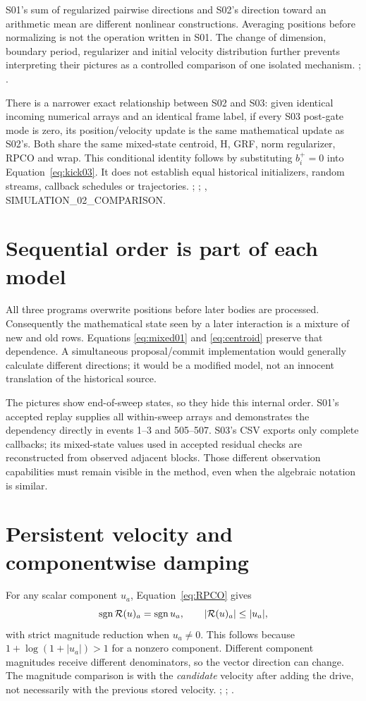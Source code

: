 S01's sum of regularized pairwise directions and S02's direction toward
an arithmetic mean are different nonlinear constructions. Averaging
positions before normalizing is not the operation written in S01.
The change of dimension, boundary period, regularizer and initial
velocity distribution further prevents interpreting their pictures as
a controlled comparison of one isolated mechanism.
; . 

There is a narrower exact relationship between S02 and S03:
given identical incoming numerical arrays and an identical frame label,
if every S03 post-gate mode is zero, its position/velocity update is
the same mathematical update as S02's. Both share the same mixed-state
centroid, H, GRF, norm regularizer, RPCO and wrap. This conditional
identity follows by substituting $b_i^+=0$ into
Equation~\eqref{eq:kick03}. It does not establish equal historical
initializers, random streams, callback schedules or trajectories.
; ;
\cite{study03}, SIMULATION\_02\_COMPARISON. 

\section{Sequential order is part of each model}
All three programs overwrite positions before later bodies are
processed. Consequently the mathematical state seen by a later
interaction is a mixture of new and old rows. Equations
\eqref{eq:mixed01} and \eqref{eq:centroid} preserve that dependence.
A simultaneous proposal/commit implementation would generally
calculate different directions; it would be a modified model,
not an innocent translation of the historical source.

The pictures show end-of-sweep states, so they hide this internal order.
S01's accepted replay supplies all within-sweep arrays and demonstrates
the dependency directly in events 1--3 and 505--507. S03's CSV exports
only complete callbacks; its mixed-state values used in accepted
residual checks are reconstructed from observed adjacent blocks.
Those different observation capabilities must remain visible in the
method, even when the algebraic notation is similar. 

\section{Persistent velocity and componentwise damping}
For any scalar component $u_a$, Equation~\eqref{eq:RPCO} gives
\begin{equation}\label{eq:damping}
\operatorname{sgn}\mathcal R(u)_a=\operatorname{sgn}u_a,\qquad
|\mathcal R(u)_a|\leq |u_a|,
\end{equation}
with strict magnitude reduction when $u_a\ne0$. This follows because
$1+\log(1+|u_a|)>1$ for a nonzero component. Different component
magnitudes receive different denominators, so the vector direction
can change. The magnitude comparison is with the \emph{candidate}
velocity after adding the drive, not necessarily with the previous
stored velocity. ;
; .

